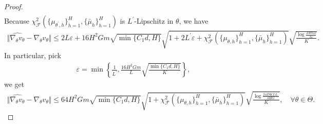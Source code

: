 \documentclass{article}
\numberwithin{equation}{section}
\begin{document}
\begin{proof}
\begin{align*}
\end{align*}
Because $\chi^2_{\mathcal{F}}(\{\mu_{\theta^\prime,h}\}_{h=1}^H,\{\bar{\mu}_h\}_{h=1}^H)$ is $L^\prime$-Lipschitz in $\theta$, we have
\begin{align*}
    \Vert\widehat{\nabla_\theta v_\theta}-\nabla_\theta v_\theta\Vert\leq 2L\varepsilon+16H^2Gm\sqrt{\min\{C_1d,H\}}\sqrt{1+2L^\prime\varepsilon + \chi^2_{\mathcal{F}}(\{\mu_{\theta,h}\}_{h=1}^H,\{\bar{\mu}_h\}_{h=1}^H)}\sqrt{\frac{\log\frac{24mD}{\delta\varepsilon}}{K}}. 
\end{align*}
In particular, pick
\begin{align*}
    \varepsilon = \min\left\{\frac{1}{L^\prime},\frac{16H^2Gm}{L}\sqrt{\frac{\min\{C_1d,H\}}{K}}\right\},
\end{align*}
we get
\begin{align*}
    \Vert\widehat{\nabla_\theta v_\theta}-\nabla_\theta v_\theta\Vert\leq 64H^2Gm\sqrt{\min\{C_1d,H\}}\sqrt{1+\chi^2_{\mathcal{F}}(\{\mu_{\theta,h}\}_{h=1}^H,\{\bar{\mu}_h\}_{h=1}^H)}\sqrt{\frac{\log\frac{24DKLL^\prime}{\delta HG}}{K}},\quad\forall\theta\in\Theta. 
\end{align*}
\end{proof}
\end{document}
